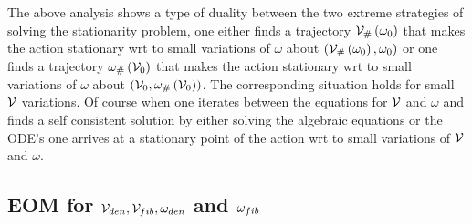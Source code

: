 The above analysis shows a type of duality between the two extreme
strategies of solving the stationarity problem, one either finds a
trajectory ${\cal V}_{\#}\left( \omega _{0}\right) $ that makes the action
stationary wrt to small variations of $\omega $ about $\left( {\cal V}%
_{\#}\left( \omega _{0}\right) ,\omega _{0}\right) $ or one finds a
trajectory $\omega _{\#}\left( {\cal V}_{0}\right) $ that makes the action
stationary wrt to small variations of $\omega $ about $\left( {\cal V}%
_{0},\omega _{\#}\left( {\cal V}_{0}\right) \right) $. The corresponding
situation holds for small ${\cal V}$ variations. Of course when one iterates
between the equations for ${\cal V}$ and $\omega $ and finds a self
consistent solution by either solving the algebraic equations or the ODE's
one arrives at a stationary point of the action wrt to small variations of $%
{\cal V}$ and $\omega $.

\subsection{EOM for ${\cal V}_{den},{\cal V}_{fib},\protect\omega _{den}$
and $\protect\omega _{fib}$}


